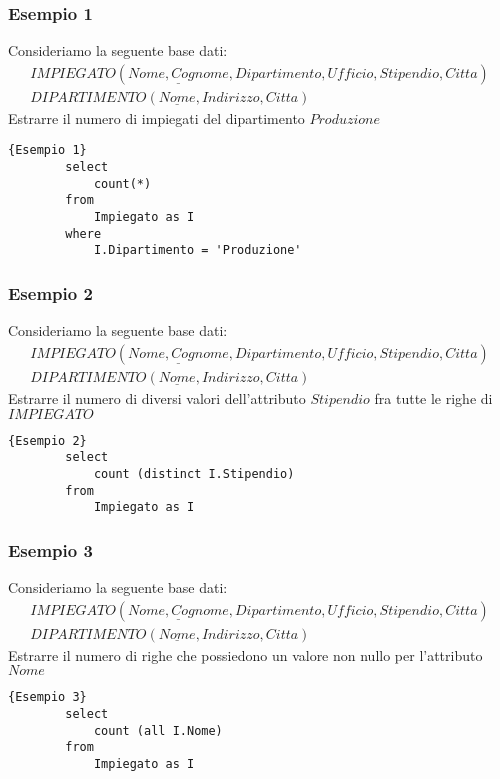 \subsubsection{Esempio 1}
Consideriamo la seguente base dati:
    \begin{equation}\begin{aligned}
        IMPIEGATO (\underline{Nome, Cognome}, Dipartimento, Ufficio, Stipendio, Citta)\\
        DIPARTIMENTO (\underline{Nome}, Indirizzo, Citta)
    \end{aligned}\end{equation}
Estrarre il numero di impiegati del dipartimento $Produzione$
    \begin{lstlisting}{Esempio 1}
        select 
            count(*)
        from 
            Impiegato as I
        where 
            I.Dipartimento = 'Produzione'
    \end{lstlisting}

\subsubsection{Esempio 2}
Consideriamo la seguente base dati:
    \begin{equation}\begin{aligned}
        IMPIEGATO (\underline{Nome, Cognome}, Dipartimento, Ufficio, Stipendio, Citta)\\
        DIPARTIMENTO (\underline{Nome}, Indirizzo, Citta)
    \end{aligned}\end{equation}
Estrarre il numero di diversi valori dell'attributo $Stipendio$ fra tutte le righe di $IMPIEGATO$
    \begin{lstlisting}{Esempio 2}
        select 
            count (distinct I.Stipendio)
        from 
            Impiegato as I
    \end{lstlisting}

\subsubsection{Esempio 3}
Consideriamo la seguente base dati:
    \begin{equation}\begin{aligned}
        IMPIEGATO (\underline{Nome, Cognome}, Dipartimento, Ufficio, Stipendio, Citta)\\
        DIPARTIMENTO (\underline{Nome}, Indirizzo, Citta)
    \end{aligned}\end{equation}
Estrarre il numero di righe che possiedono un valore non nullo per l'attributo $Nome$
    \begin{lstlisting}{Esempio 3}
        select 
            count (all I.Nome)
        from 
            Impiegato as I
    \end{lstlisting}

